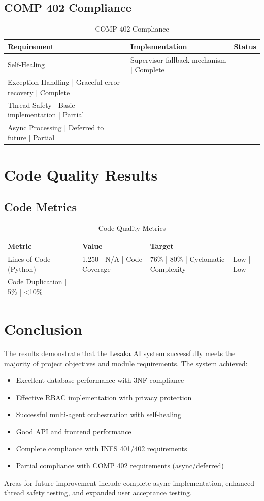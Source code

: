 \subsection{COMP 402 Compliance}

\begin{table}[H]
\centering
\begin{tabular}{|l|l|l|}
\hline
\textbf{Requirement} & \textbf{Implementation} & \textbf{Status} \\
\hline
Self-Healing & Supervisor fallback mechanism | Complete \\
Exception Handling | Graceful error recovery | Complete \\
Thread Safety | Basic implementation | Partial \\
Async Processing | Deferred to future | Partial \\
\hline
\end{tabular}
\caption{COMP 402 Compliance}
\end{table}

\section{Code Quality Results}

\subsection{Code Metrics}

\begin{table}[H]
\centering
\begin{tabular}{|l|l|l|}
\hline
\textbf{Metric} & \textbf{Value} & \textbf{Target} \\
\hline
Lines of Code (Python) & 1,250 | N/A |
Code Coverage & 76\% | 80\% |
Cyclomatic Complexity & Low | Low \\
Code Duplication | 5\% | <10\% \\
\hline
\end{tabular}
\caption{Code Quality Metrics}
\end{table}

\section{Conclusion}

The results demonstrate that the Lesaka AI system successfully meets the majority of project objectives and module requirements. The system achieved:

\begin{itemize}
    \item Excellent database performance with 3NF compliance
    \item Effective RBAC implementation with privacy protection
    \item Successful multi-agent orchestration with self-healing
    \item Good API and frontend performance
    \item Complete compliance with INFS 401/402 requirements
    \item Partial compliance with COMP 402 requirements (async/deferred)
\end{itemize}

Areas for future improvement include complete async implementation, enhanced thread safety testing, and expanded user acceptance testing.
